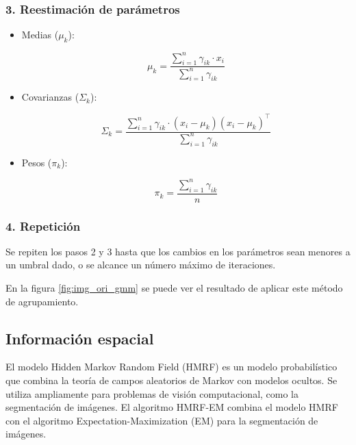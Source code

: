\subsubsection{3. Reestimación de parámetros}

\begin{itemize}
\setlength{\itemsep}{-1ex}
    \item{\begin{flushleft} Medias ($\mu_k$):  \end{flushleft}}

    $$\mu_k =\frac{\sum_{i=1}^n \gamma_{ik} \cdot x_i }{\sum_{i=1}^n \gamma_{ik} }$$

    \item{\begin{flushleft} Covarianzas ($\Sigma_k$): \end{flushleft}}

    $$\Sigma_k =\frac{\sum_{i=1}^n \gamma_{ik} \cdot (x_i -\mu_k )(x_i -\mu_k )^{\top } }{\sum_{i=1}^n \gamma_{ik} }$$

    \item{\begin{flushleft} Pesos ($\pi_k$): \end{flushleft}}
    
    $$\pi_k =\frac{\sum_{i=1}^n \gamma_{ik} }{n}$$
\end{itemize}

\subsubsection{4. Repetición}

Se repiten los pasos 2 y 3 hasta que los cambios en los parámetros sean menores a un umbral dado, o se alcance un número máximo de iteraciones.

En la figura \ref{fig:img_ori_gmm} se puede ver el resultado de aplicar este método de agrupamiento.

\subsection{Información espacial}\label{informacion-espacial}

El modelo Hidden Markov Random Field (HMRF) \cite{wang2012hmrf} es un modelo probabilístico que combina la teoría de campos aleatorios de Markov con modelos ocultos. Se utiliza ampliamente para problemas de visión computacional, como la segmentación de imágenes. El algoritmo HMRF-EM combina el modelo HMRF con el algoritmo Expectation-Maximization (EM) para la segmentación de imágenes.


